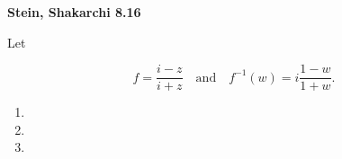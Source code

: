 \textbf{Stein, Shakarchi 8.16}

Let

$$
f = \frac{i - z}{i + z} \quad \text{and} \quad f^{-1}(w) = i \frac{1 - w}{1 + w}.
$$

\begin{enumerate}
  \item 
  \pagebreak
  \item 
  \pagebreak
  \item 
\end{enumerate}